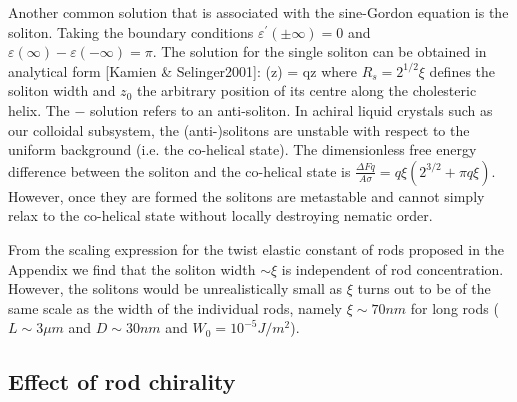 Another common solution that is associated with the sine-Gordon equation is the soliton. Taking the boundary conditions $\varepsilon^{\prime}(\pm \infty) = 0$ and $\varepsilon(\infty) - \varepsilon(-\infty)  = \pi$. The solution for the single soliton can be obtained in analytical form  [Kamien \& Selinger2001]:
\beq
\phi(z) =  qz \pm {}  \arctan {}
\eeq
where $ R_{s} = 2^{1/2} \xi$ defines the soliton width and $z_{0}$ the arbitrary position of its centre along the cholesteric helix. The $-$ solution refers to an anti-soliton. In achiral liquid crystals such as our colloidal subsystem, the (anti-)solitons are unstable with respect to the uniform background (i.e. the co-helical state). The dimensionless free energy difference between the soliton and the co-helical state is  $\tfrac{\Delta Fq}{ A \sigma} = q \xi (2^{3/2} + \pi q\xi)$. However, once they are formed the solitons are metastable and cannot simply relax to the co-helical state without locally destroying nematic order.

From the scaling expression  for the twist elastic constant of rods proposed in the Appendix we find that the soliton width $\sim \xi$ is independent of rod concentration. However, the solitons would be unrealistically small as $\xi $ turns out to be of the same scale as the width of the individual rods, namely  $\xi \sim 70 nm$ for long rods ($L \sim 3 \mu m$ and $D \sim 30 nm$ and $W_{0} = 10^{-5} J/m^{2}$).


\subsection{Effect of rod chirality}

